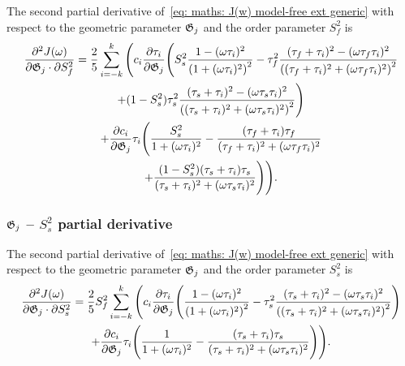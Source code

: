 The second partial derivative of~\eqref{eq: maths: J(w) model-free ext generic} with respect to the geometric parameter $\mathfrak{G}_j$ and the order parameter $S^2_f$ is
\begin{multline}
    \frac{\partial^2 J(\omega)}{\partial \mathfrak{G}_j \cdot \partial S^2_f} = \frac{2}{5} \sum_{i=-k}^k \Bigg(
        c_i \frac{\partial \tau_i}{\partial \mathfrak{G}_j} \Bigg(
            S^2_s \frac{1 - (\omega \tau_i)^2}{\left(1 + (\omega \tau_i)^2 \right)^2}
            - \tau_f^2 \frac{(\tau_f + \tau_i)^2 - (\omega \tau_f \tau_i)^2}{\left((\tau_f + \tau_i)^2 + (\omega \tau_f \tau_i)^2 \right)^2} \\
            + (1 - S^2_s) \tau_s^2 \frac{(\tau_s + \tau_i)^2 - (\omega \tau_s \tau_i)^2}{\left((\tau_s + \tau_i)^2 + (\omega \tau_s \tau_i)^2 \right)^2}
        \Bigg) \\
        +  \frac{\partial c_i}{\partial \mathfrak{G}_j} \tau_i \Bigg(
            \frac{S^2_s}{1 + (\omega \tau_i)^2}
            - \frac{(\tau_f + \tau_i)\tau_f}{(\tau_f + \tau_i)^2 + (\omega \tau_f \tau_i)^2} \\
            + \frac{(1 - S^2_s)(\tau_s + \tau_i)\tau_s}{(\tau_s + \tau_i)^2 + (\omega \tau_s \tau_i)^2}
        \Bigg)
    \Bigg).
\end{multline}



\subsubsection{$\mathfrak{G}_j$ -- $S^2_s$ partial derivative}

The second partial derivative of~\eqref{eq: maths: J(w) model-free ext generic} with respect to the geometric parameter $\mathfrak{G}_j$ and the order parameter $S^2_s$ is
\begin{multline}
    \frac{\partial^2 J(\omega)}{\partial \mathfrak{G}_j \cdot \partial S^2_s} = \frac{2}{5} S^2_f \sum_{i=-k}^k \Bigg(
        c_i \frac{\partial \tau_i}{\partial \mathfrak{G}_j} \Bigg(
            \frac{1 - (\omega \tau_i)^2}{\left(1 + (\omega \tau_i)^2 \right)^2}
            - \tau_s^2 \frac{(\tau_s + \tau_i)^2 - (\omega \tau_s \tau_i)^2}{\left((\tau_s + \tau_i)^2 + (\omega \tau_s \tau_i)^2 \right)^2}
        \Bigg) \\
        +  \frac{\partial c_i}{\partial \mathfrak{G}_j} \tau_i \Bigg(
            \frac{1}{1 + (\omega \tau_i)^2}
            - \frac{(\tau_s + \tau_i)\tau_s}{(\tau_s + \tau_i)^2 + (\omega \tau_s \tau_i)^2}
        \Bigg)
    \Bigg).
\end{multline}



